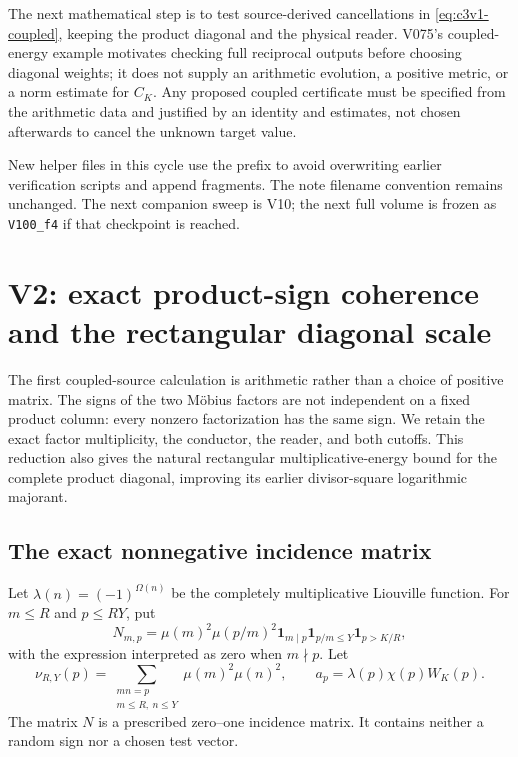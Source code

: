 \documentclass[11pt]{article}
\theoremstyle{remark}
\begin{document}
The next mathematical step is to test source-derived cancellations in
\eqref{eq:c3v1-coupled}, keeping the product diagonal and the physical
reader.  V075's coupled-energy example motivates checking full
reciprocal outputs before choosing diagonal weights; it does not
supply an arithmetic evolution, a positive metric, or a norm estimate
for \(C_K\).  Any proposed coupled certificate must be specified from
the arithmetic data and justified by an identity and estimates,
not chosen afterwards to cancel the unknown target value.

New helper files in this cycle use the prefix
 to avoid overwriting earlier verification scripts
and append fragments.  The note filename convention remains unchanged.
The next companion sweep is V10; the next full volume is frozen as
\texttt{V100\_f4} if that checkpoint is reached.

\clearpage
\section{V2: exact product-sign coherence and the rectangular diagonal scale}
\label{sec:c3v2-product-sign}
\begingroup
\setcounter{equation}{0}
\renewcommand{\theequation}{C3.2.\arabic{equation}}
\renewcommand{\theHequation}{c3v2.\arabic{equation}}

The first coupled-source calculation is arithmetic rather than a choice
of positive matrix.  The signs of the two M\"obius factors are not
independent on a fixed product column: every nonzero factorization has
the same sign.  We retain the exact factor multiplicity, the conductor,
the reader, and both cutoffs.  This reduction also gives the natural
rectangular multiplicative-energy bound for the complete product
diagonal, improving its earlier divisor-square logarithmic majorant.

\subsection{The exact nonnegative incidence matrix}

Let \(\lambda(n)=(-1)^{\Omega(n)}\) be the completely multiplicative
Liouville function.  For \(m\le R\) and \(p\le RY\), put
\[
 N_{m,p}=\mu(m)^2\mu(p/m)^2
       \mathbf1_{m\mid p}\mathbf1_{p/m\le Y}\mathbf1_{p>K/R},
\]
with the expression interpreted as zero when \(m\nmid p\).
Let
\[
 \nu_{R,Y}(p)=\sum_{\substack{mn=p\\m\le R,\ n\le Y}}
                                \mu(m)^2\mu(n)^2,
 \qquad a_p=\lambda(p)\chi(p)W_K(p).
\]
The matrix \(N\) is a prescribed zero--one incidence matrix.  It
contains neither a random sign nor a chosen test vector.
\end{document}
